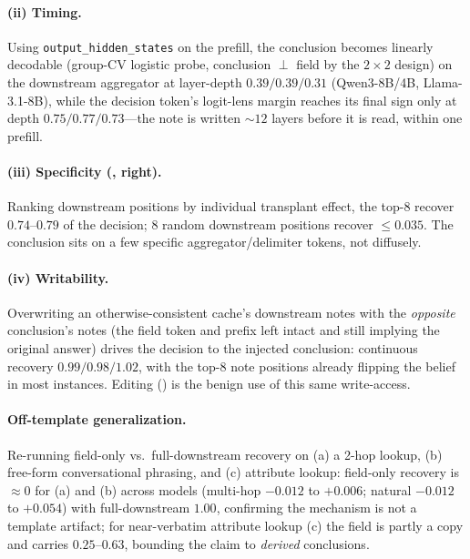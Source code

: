 \paragraph{(ii) Timing.} Using \texttt{output\_hidden\_states} on the prefill, the conclusion
becomes linearly decodable (group-CV logistic probe, conclusion $\perp$ field by the $2{\times}2$
design) on the downstream aggregator at layer-depth $0.39/0.39/0.31$ (Qwen3-8B/4B,
Llama-3.1-8B), while the decision token's logit-lens margin reaches its final sign only at depth
$0.75/0.77/0.73$---the note is written ${\sim}12$ layers before it is read, within one prefill.

\paragraph{(iii) Specificity (, right).} Ranking downstream positions by
individual transplant effect, the top-$8$ recover $0.74$--$0.79$ of the decision; $8$ random
downstream positions recover ${\le}0.035$. The conclusion sits on a few specific
aggregator/delimiter tokens, not diffusely.

\paragraph{(iv) Writability.} Overwriting an otherwise-consistent cache's downstream notes with
the \emph{opposite} conclusion's notes (the field token and prefix left intact and still
implying the original answer) drives the decision to the injected conclusion: continuous
recovery $0.99/0.98/1.02$, with the top-$8$ note positions already flipping the belief in most
instances. Editing () is the benign use of this same write-access.

\paragraph{Off-template generalization.} Re-running field-only vs.\ full-downstream recovery on
(a) a 2-hop lookup, (b) free-form conversational phrasing, and (c) attribute lookup: field-only
recovery is ${\approx}0$ for (a) and (b) across models (multi-hop $-0.012$ to $+0.006$; natural
$-0.012$ to $+0.054$) with full-downstream $1.00$, confirming the mechanism is not a template
artifact; for near-verbatim attribute lookup (c) the field is partly a copy and carries
$0.25$--$0.63$, bounding the claim to \emph{derived} conclusions.

